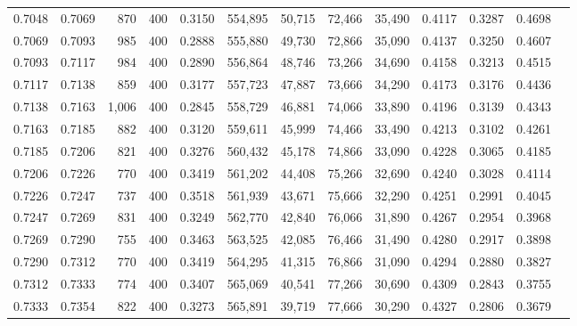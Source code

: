 \begin{tabular}{rrrrrrrrrrrrr}
0.7048 & 0.7069 &    870 & 400 &                                     0.3150 & 554,895 &  50,715 &  72,466 &  35,490 & 0.4117 & 0.3287 & 0.4698 \\
0.7069 & 0.7093 &    985 & 400 &                                     0.2888 & 555,880 &  49,730 &  72,866 &  35,090 & 0.4137 & 0.3250 & 0.4607 \\
0.7093 & 0.7117 &    984 & 400 &                                     0.2890 & 556,864 &  48,746 &  73,266 &  34,690 & 0.4158 & 0.3213 & 0.4515 \\
0.7117 & 0.7138 &    859 & 400 &                                     0.3177 & 557,723 &  47,887 &  73,666 &  34,290 & 0.4173 & 0.3176 & 0.4436 \\
0.7138 & 0.7163 &  1,006 & 400 &                                     0.2845 & 558,729 &  46,881 &  74,066 &  33,890 & 0.4196 & 0.3139 & 0.4343 \\
0.7163 & 0.7185 &    882 & 400 &                                     0.3120 & 559,611 &  45,999 &  74,466 &  33,490 & 0.4213 & 0.3102 & 0.4261 \\
0.7185 & 0.7206 &    821 & 400 &                                     0.3276 & 560,432 &  45,178 &  74,866 &  33,090 & 0.4228 & 0.3065 & 0.4185 \\
0.7206 & 0.7226 &    770 & 400 &                                     0.3419 & 561,202 &  44,408 &  75,266 &  32,690 & 0.4240 & 0.3028 & 0.4114 \\
0.7226 & 0.7247 &    737 & 400 &                                     0.3518 & 561,939 &  43,671 &  75,666 &  32,290 & 0.4251 & 0.2991 & 0.4045 \\
0.7247 & 0.7269 &    831 & 400 &                                     0.3249 & 562,770 &  42,840 &  76,066 &  31,890 & 0.4267 & 0.2954 & 0.3968 \\
0.7269 & 0.7290 &    755 & 400 &                                     0.3463 & 563,525 &  42,085 &  76,466 &  31,490 & 0.4280 & 0.2917 & 0.3898 \\
0.7290 & 0.7312 &    770 & 400 &                                     0.3419 & 564,295 &  41,315 &  76,866 &  31,090 & 0.4294 & 0.2880 & 0.3827 \\
0.7312 & 0.7333 &    774 & 400 &                                     0.3407 & 565,069 &  40,541 &  77,266 &  30,690 & 0.4309 & 0.2843 & 0.3755 \\
0.7333 & 0.7354 &    822 & 400 &                                     0.3273 & 565,891 &  39,719 &  77,666 &  30,290 & 0.4327 & 0.2806 & 0.3679 \\

\end{tabular}
